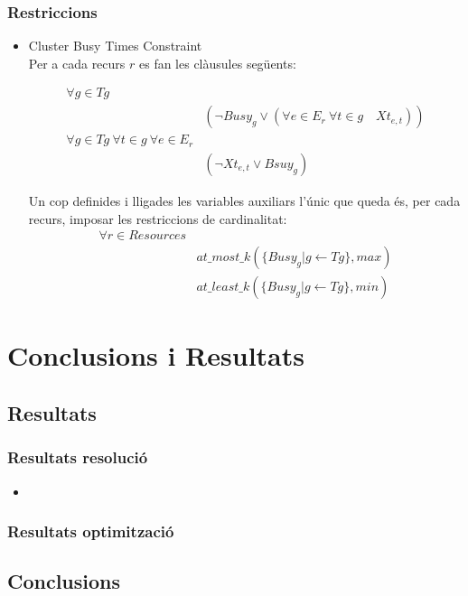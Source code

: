 \documentclass[11pt]{beamer}
\begin{document}
  \begin{frame}
    \frametitle{Restriccions}

    \begin{itemize}
    
      \item Cluster Busy Times Constraint \\
      Per a cada recurs $r$ es fan les clàusules següents:
      
      \begin{align*}
        \forall g \in Tg & \\
        &(\neg Busy_g \lor (\forall e \in E_r \ \forall t \in g \quad Xt_{e,t}))\\
        \forall g \in Tg \ \forall t \in g \ \forall e \in E_r &\\
        & (\neg Xt_{e,t} \lor Bsuy_g)
      \end{align*}
    
      Un cop definides i lligades les variables auxiliars l'únic que queda és, per cada recurs, imposar les restriccions de cardinalitat:
      \begin{align*}
        \forall r \in Resources &\\
        & at\_most\_k(\{ Busy_g | g \leftarrow Tg\}, max) \\
        & at\_least\_k(\{ Busy_g | g \leftarrow Tg\}, min)
       \end{align*}
          
    \end{itemize}
  
  \end{frame}


  \section{Conclusions i Resultats}
  \subsection{Resultats}
  
  \begin{frame}
    \frametitle{Resultats resolució}
    \begin{itemize}
      \item 
    \end{itemize}

  \end{frame}

  \begin{frame}
    \frametitle{Resultats optimització}
  \end{frame}

  \subsection{Conclusions}

  
  \begin{frame}
  \end{frame}




  
\end{document}
